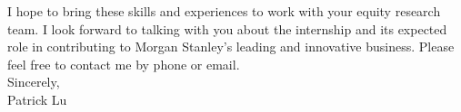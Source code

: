 \documentclass{coverletter} %
\begin{document}
\begin{rSection}{}
\begin{rSubsection}{}{}{}{}
\end{rSubsection}
I hope to bring these skills and experiences to work with your equity research team. I look forward to talking with you about the internship and its expected role in contributing to Morgan Stanley's leading and innovative business. Please feel free to contact me by phone or email.\\

Sincerely,\\
Patrick Lu
\end{rSection}



\end{document}
